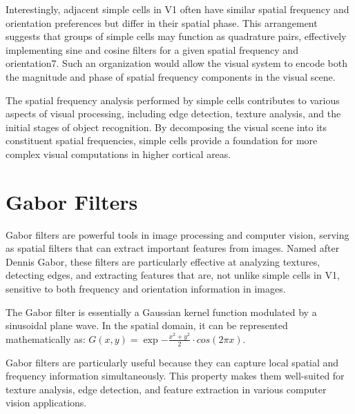 Interestingly, adjacent simple cells in V1 often have similar spatial frequency and orientation preferences but differ in their spatial phase. This arrangement suggests that groups of simple cells may function as quadrature pairs, effectively implementing sine and cosine filters for a given spatial frequency and orientation7. Such an organization would allow the visual system to encode both the magnitude and phase of spatial frequency components in the visual scene.

The spatial frequency analysis performed by simple cells contributes to various aspects of visual processing, including edge detection, texture analysis, and the initial stages of object recognition. By decomposing the visual scene into its constituent spatial frequencies, simple cells provide a foundation for more complex visual computations in higher cortical areas.

\section{Gabor Filters}
Gabor filters are powerful tools in image processing and computer vision, serving as spatial filters that can extract important features from images. Named after Dennis Gabor, these filters are particularly effective at analyzing textures, detecting edges, and extracting features that are, not unlike simple cells in V1, sensitive to both frequency and orientation information in images.

The Gabor filter is essentially a Gaussian kernel function modulated by a sinusoidal plane wave. In the spatial domain, it can be represented mathematically as: $G(x,y)=\exp{-\frac{x^2+y^2}{2}}\cdot cos(2\pi x)$.

Gabor filters are particularly useful because they can capture local spatial and frequency information simultaneously. This property makes them well-suited for texture analysis, edge detection, and feature extraction in various computer vision applications.


